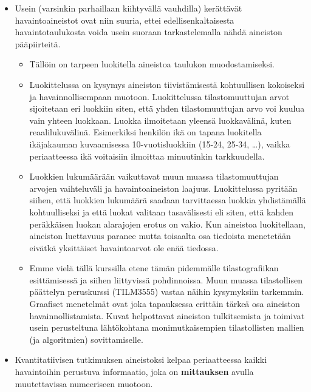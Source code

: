 \documentclass[
]{book}
\providecommand{\tightlist}{%
  \setlength{\itemsep}{0pt}\setlength{\parskip}{0pt}}
\begin{document}
\begin{itemize}
\tightlist
\item
  Usein (varsinkin parhaillaan kiihtyvällä vauhdilla) kerättävät havaintoaineistot ovat niin suuria, ettei edellisenkaltaisesta havaintotaulukosta voida usein suoraan tarkastelemalla nähdä aineiston pääpiirteitä.

  \begin{itemize}
  \tightlist
  \item
    Tällöin on tarpeen luokitella aineistoa taulukon muodostamiseksi.\\
  \item
    Luokittelussa on kysymys aineiston tiivistämisestä kohtuullisen kokoiseksi ja havainnollisempaan muotoon. Luokittelussa tilastomuuttujan arvot sijoitetaan eri luokkiin siten, että yhden tilastomuuttujan arvo voi kuulua vain yhteen luokkaan. Luokka ilmoitetaan yleensä luokkavälinä, kuten reaalilukuvälinä. Esimerkiksi henkilön ikä on tapana luokitella ikäjakauman kuvaamisessa 10-vuotisluokkiin (15-24, 25-34, \ldots), vaikka periaatteessa ikä voitaisiin ilmoittaa minuutinkin tarkkuudella.\\
  \item
    Luokkien lukumäärään vaikuttavat muun muassa tilastomuuttujan arvojen vaihteluväli ja havaintoaineiston laajuus. Luokittelussa pyritään siihen, että luokkien lukumäärä saadaan tarvittaessa luokkia yhdistämällä kohtuulliseksi ja että luokat valitaan tasavälisesti eli siten, että kahden peräkkäisen luokan alarajojen erotus on vakio. Kun aineistoa luokitellaan, aineiston luettavuus paranee mutta toisaalta osa tiedoista menetetään eivätkä yksittäiset havaintoarvot ole enää tiedossa.\\
  \item
    Emme vielä tällä kurssilla etene tämän pidemmälle tilastografiikan esittämisessä ja siihen liittyvissä pohdinnoissa. Muun muassa tilastollisen päättelyn peruskurssi (TILM3555) vastaa näihin kysymyksiin tarkemmin. Graafiset menetelmät ovat joka tapauksessa erittäin tärkeä osa aineiston havainnollistamista. Kuvat helpottavat aineiston tulkitsemista ja toimivat usein perusteltuna lähtökohtana monimutkaisempien tilastollisten mallien (ja algoritmien) sovittamiselle.
  \end{itemize}
\item
  Kvantitatiivisen tutkimuksen aineistoksi kelpaa periaatteessa kaikki havaintoihin perustuva informaatio, joka on \textbf{mittauksen} avulla muutettavissa numeeriseen muotoon.


\end{itemize}
\end{document}
